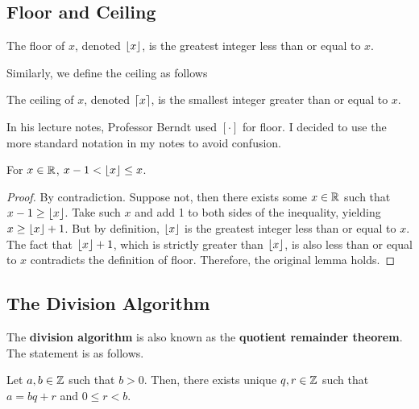 \subsection{Floor and Ceiling}

\begin{definition}[Floor]
    The floor of $x$, denoted $\lfloor x\rfloor$, is the greatest integer less than or equal to $x$.
\end{definition}

Similarly, we define the ceiling as follows

\begin{definition}[Ceiling]
    The ceiling of $x$, denoted $\lceil x\rceil$, is the smallest integer greater than or equal to $x$.
\end{definition}

\begin{remark}
    In his lecture notes, Professor Berndt used $[\cdot]$ for floor. I decided to use the more standard notation in my notes to avoid confusion.
\end{remark}

\begin{lemma} \label{lem:div-algo-lem1}
    For $x \in \mathbb{R}$, $x-1 < \lfloor x\rfloor \leq x$.
\end{lemma}

\begin{proof}
    By contradiction. Suppose not, then there exists some $x \in \mathbb{R}$ such that $x-1 \geq \lfloor x\rfloor$. Take such $x$ and add 1 to both sides of the inequality, yielding $x \geq \lfloor x\rfloor + 1$. But by definition, $\lfloor x\rfloor$ is the greatest integer less than or equal to $x$. The fact that $\lfloor x\rfloor+1$, which is strictly greater than $\lfloor x\rfloor$, is also less than or equal to $x$ contradicts the definition of floor. Therefore, the original lemma holds. 
\end{proof}

\subsection{The Division Algorithm}

The \textbf{division algorithm} is also known as the \textbf{quotient remainder theorem}. The statement is as follows.

\begin{theorem}
    Let $a,b \in \mathbb{Z}$ such that $b > 0$. Then, there exists unique $q,r \in \mathbb{Z}$ such that $a = bq + r$ and $0 \leq r < b$.    
\end{theorem}

